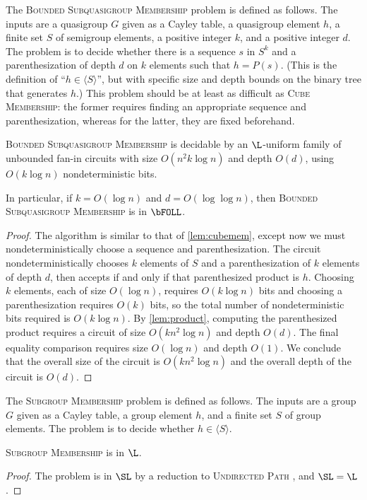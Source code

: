 \documentclass{article}
\newcommand{\gen}[1]{\langle #1 \rangle}
\begin{document}
The \textsc{Bounded Subquasigroup Membership} problem is defined as follows.
The inputs are a quasigroup $G$ given as a Cayley table, a quasigroup element $h$, a finite set $S$ of semigroup elements, a positive integer $k$, and a positive integer $d$.
The problem is to decide whether there is a sequence $s$ in $S^k$ and a parenthesization of depth $d$ on $k$ elements such that $h = P(s)$.
(This is the definition of ``$h \in \gen{S}$'', but with specific size and depth bounds on the binary tree that generates $h$.)
This problem should be at least as difficult as \textsc{Cube Membership}: the former requires finding an appropriate sequence and parenthesization, whereas for the latter, they are fixed beforehand.

\begin{lemma}\label{lem:subquasigroupmem}
  \textsc{Bounded Subquasigroup Membership} is decidable by an $\L$-uniform family of unbounded fan-in circuits with size $O(n^2 k \log n)$ and depth $O(d)$, using $O(k \log n)$ nondeterministic bits.

  In particular, if $k = O(\log n)$ and $d = O(\log \log n)$, then \textsc{Bounded Subquasigroup Membership} is in $\bFOLL$.
\end{lemma}
\begin{proof}
  The algorithm is similar to that of \autoref{lem:cubemem}, except now we must nondeterministically choose a sequence and parenthesization.
  The circuit nondeterministically chooses $k$ elements of $S$ and a parenthesization of $k$ elements of depth $d$, then accepts if and only if that parenthesized product is $h$.
  Choosing $k$ elements, each of size $O(\log n)$, requires $O(k \log n)$ bits and choosing a parenthesization requires $O(k)$ bits, so the total number of nondeterministic bits required is $O(k \log n)$.
  By \autoref{lem:product}, computing the parenthesized product requires a circuit of size $O(k n^2 \log n)$ and depth $O(d)$.
  The final equality comparison requires size $O(\log n)$ and depth $O(1)$.
  We conclude that the overall size of the circuit is $O(k n^2 \log n)$ and the overall depth of the circuit is $O(d)$.
\end{proof}

The \textsc{Subgroup Membership} problem is defined as follows.
The inputs are a group $G$ given as a Cayley table, a group element $h$, and a finite set $S$ of group elements.
The problem is to decide whether $h \in \gen{S}$.

\begin{lemma}\label{lem:subgroupmem}
  \textsc{Subgroup Membership} is in $\L$.
\end{lemma}
\begin{proof}
  The problem is in $\SL$ by a reduction to \textsc{Undirected Path} \autocite[Section~3]{bm89}, and $\SL = \L$ \cite{reingold08}.
\end{proof}
\end{document}
